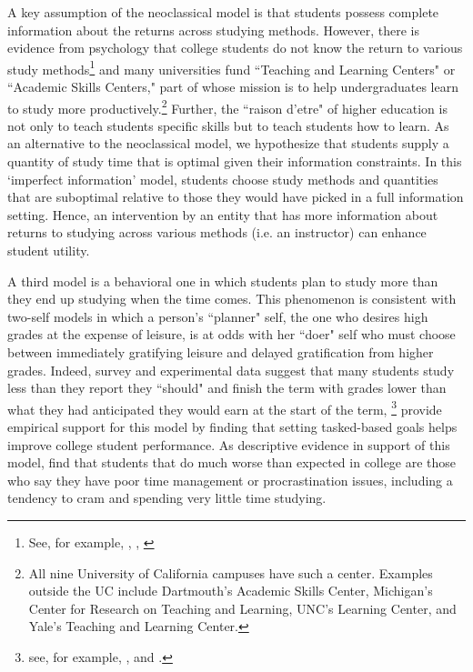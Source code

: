\documentclass[12pt]{article}
\begin{document}
A key assumption of the neoclassical model is that students possess complete information about the returns across studying methods. However, there is evidence from psychology that college students do not know the return to various study methods\footnote{See, for example, \textcite{mccabe2011}, \textcite{prcc2007}, \textcite{drmnw2013}} and many universities fund ``Teaching and Learning Centers" or ``Academic Skills Centers," part of whose mission is to help undergraduates learn to study more productively.\footnote{All nine University of California campuses have such a center. Examples outside the UC include Dartmouth's Academic Skills Center, Michigan's Center for Research on Teaching and Learning, UNC's Learning Center, and Yale's Teaching and Learning Center.} Further, the ``raison d'etre" of higher education is not only to teach students specific skills but to teach students how to learn. As an alternative to the neoclassical model, we hypothesize that students supply a quantity of study time that is optimal given their information constraints. In this `imperfect information' model, students choose study methods and quantities that are suboptimal relative to those they would have picked in a full information setting. Hence, an intervention by an entity that has more information about returns to studying across various methods (i.e. an instructor) can enhance student utility.

A third model is a behavioral one in which students plan to study more than they end up studying when the time comes. This phenomenon is consistent with two-self models in which a person's ``planner" self, the one who desires high grades at the expense of leisure, is at odds with her ``doer" self who must choose between immediately gratifying leisure and delayed gratification from higher grades. Indeed, survey and experimental data suggest that many students study less than they report they ``should" and finish the term with grades lower than what they had anticipated they would earn at the start of the term,
\footnote{see, for example, \textcite{ferrari1992}, \textcite{ccog2017} and \textcite{lo2016}.} \textcite{cgpr2020} provide empirical support for this model by finding that setting tasked-based goals helps improve college student performance. As descriptive evidence in support of this model, \textcite{blmo2019} find that students that do much worse than expected in college are those who say they have poor time management or procrastination issues, including a tendency to cram and spending very little time studying.
\end{document}
